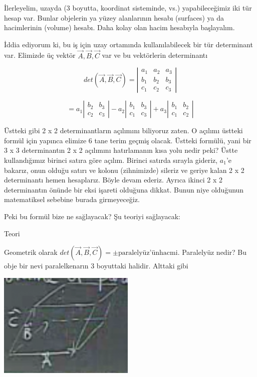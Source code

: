 \documentclass[12pt,fleqn]{article}\usepackage{../../common}
\begin{document}
İlerleyelim, uzayda (3 boyutta, koordinat sisteminde, vs.) yapabileceğimiz iki
tür hesap var. Bunlar objelerin ya yüzey alanlarının hesabı (surfaces) ya da 
hacimlerinin (volume) 
hesabı. Daha kolay olan hacim hesabıyla başlayalım.

İddia ediyorum ki, bu iş için uzay ortamında kullanılabilecek bir tür
determinant var. Elimizde üç vektör $\vec{A},\vec{B},\vec{C}$ var ve 
bu vektörlerin determinantı

$$ det(\vec{A},\vec{B},\vec{C}) = 
\left|\begin{array}{rrr}
a_1 & a_2 & a_3 \\
b_1 & b_2 & b_3 \\
c_1 & c_2 & c_3 
\end{array}\right|
 $$

$$ = 
a_1
\left|\begin{array}{rr}
b_2 & b_3 \\
c_2 & c_3
\end{array}\right|
-
a_2
\left|\begin{array}{rr}
b_1 & b_3 \\
c_1 & c_3
\end{array}\right|
+
a_3
\left|\begin{array}{rr}
b_1 & b_2 \\
c_1 & c_2
\end{array}\right|
$$

Üstteki gibi 2 x 2 determinantların açılımını biliyoruz zaten. O açılımı üstteki
formül için yapınca elimize 6 tane terim geçmiş olacak. Üstteki formülü, yani
bir 3 x 3 determinantın 2 x 2 açılımını hatırlamanın kısa yolu nedir peki? Üstte
kullandığımız birinci satıra göre açılım. Birinci satırda sırayla gideriz,
$a_1$'e bakarız, onun olduğu satırı ve kolonu (zihnimizde) sileriz ve geriye
kalan 2 x 2 determinantı hemen hesaplarız. Böyle devam ederiz. Ayrıca ikinci 2 x
2 determinantın önünde bir eksi işareti olduğuna dikkat. Bunun niye olduğunun
matematiksel sebebine burada girmeyeceğiz.

Peki bu formül bize ne sağlayacak? Şu teoriyi sağlayacak:

Teori

Geometrik olarak $det(\vec{A},\vec{B},\vec{C}) = \pm \textrm{paralelyüz'ünhacmi}$.
Paralelyüz nedir? Bu obje bir nevi paralelkenarın 3 boyuttaki halidir.  Alttaki gibi

\includegraphics[height=5cm]{2_9.png}
\end{document}
